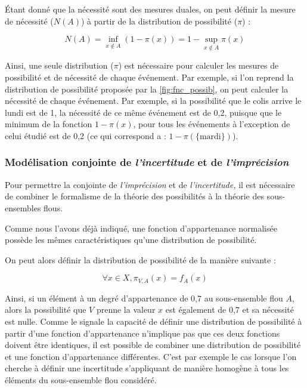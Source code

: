 {Étant donné que la nécessité sont des mesures duales, on peut définir
la mesure de nécessité (\(N(A)\)) à partir de la distribution de
possibilité (\(π\)) :

\begin{equation}
  N(A) = \inf_{x ∉ A}(1-π(x)) = 1 - \sup_{x ∉ A}π(x)
\end{equation}

Ainsi, une seule distribution (\(\pi\)) est nécessaire pour calculer
les mesures de possibilité et de nécessité de chaque événement. Par
exemple, si l'on reprend la distribution de possibilité proposée par
la \autoref{fig:fnc_possib}, on peut calculer la nécessité de chaque
événement. Par exemple, si la possibilité que le colis arrive le lundi
est de 1, la nécessité de ce même événement est de 0,2, puisque que le
minimum de la fonction \(1-π(x)\), pour tous les événements à
l'exception de celui étudié est de 0,2 (ce qui correspond a :
\(1-π(\{\text{mardi}\})\)).

\subsubsection{Modélisation conjointe de \emph{l'incertitude} et de
  \emph{l'imprécision}}

Pour permettre la conjointe de \emph{l'imprécision} et de
\emph{l'incertitude,} il est nécessaire de combiner le formalisme de
la théorie des possibilités à la théorie des sous-ensembles flous.

Comme nous l'avons déjà indiqué, une fonction d'appartenance
normalisée possède les mêmes caractéristiques qu'une distribution de
possibilité.


On peut alors définir la distribution de possibilité de la manière
suivante :

\begin{equation}
  \forall x \in X, \pi_{V, A}(x)=f_A(x)
\end{equation}

Ainsi, si un élément à un degré d'appartenance de 0,7 au sous-ensemble
flou \(A\), alors la possibilité que \(V\) prenne la valeur \(x\) est
également de 0,7 et sa nécessité est nulle.
%
Comme le signale \textcite{Bouchon-Meunier1995} la capacité de définir
une distribution de possibilité à partir d'une fonction d'appartenance
n'implique pas que ces deux fonctions doivent être identiques, il est
possible de combiner une distribution de possibilité et une fonction
d'appartenance différentes.
%
C'est par exemple le cas lorsque l'on cherche à définir une
incertitude s'appliquant de manière homogène à tous les éléments du
sous-ensemble flou considéré.

}
